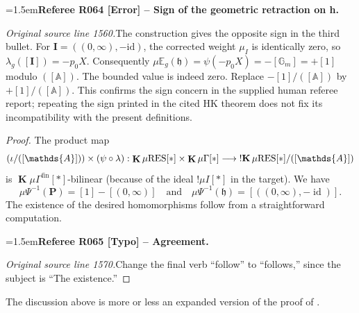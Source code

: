 \documentclass[12pt]{amsart}
\newcommand{\RefereeRemark}[4]{%
  \par\medskip\begingroup\normalfont\small\color{RefereePurple}%
  \emergencystretch=1.5em\noindent\textbf{Referee R#1 [#2] -- #3.}\par\nobreak\noindent #4\par
  \endgroup\medskip
}
\theoremstyle{plain}
\theoremstyle{definition}
\theoremstyle{remark}
\numberwithin{equation}{section}
\theoremstyle{plain}
\DeclareMathOperator{\id}{id}
\newcommand{\A}{\mathds{A}}
\newcommand{\dand}{\quad \text{and} \quad}
\newcommand{\gh}{\mathfrak{h}}
\newcommand{\0}{\emptyset}
\newcommand{\fun}{\longrightarrow}
\newcommand{\mG}{{\mu}{\Gamma}}
\newcommand{\RES}{\textup{RES}}
\newcommand{\mgRES}{{\mu}{\RES}}
\DeclareMathOperator{\ggk}{\mathbf{K}}
\DeclareMathOperator{\sggk}{!\mathbf{K}}
\DeclareMathOperator{\fin}{fin}
\begin{document}
\RefereeRemark{064}{Error}{Sign of the geometric retraction on h}{%
\textit{Original source line 1560.}\quad The construction gives the opposite sign in the third bullet. For $\bm I=((0,\infty),-\mathrm{id})$, the corrected weight $\mu_I$ is identically zero, so $\lambda_g([\bm I])=-p_0X$. Consequently $\mu\mathbb E_g(\mathfrak h)=\psi(-p_0X)=-[\mathbb G_m]=+[1]$ modulo $([\mathbb A])$. The bounded value is indeed zero. Replace $-[1]/([\mathbb A])$ by $+[1]/([\mathbb A])$. This confirms the sign concern in the supplied human referee report; repeating the sign printed in the cited HK theorem does not fix its incompatibility with the present definitions.
}
\begin{proof}
The product map
\[
(\iota /([\A])) \times (\psi \circ \lambda) : \ggk \mgRES[*] \times  \ggk \mG[*] \fun    \sggk \mgRES[*] /([\A])
\]
is $\ggk \mG^{\fin}[*]$-bilinear (because of  the ideal $!\mu I[*]$ in the target). We have
\[
{\mu}\Psi^{-1}(\bm P) = [1]-[(0, \infty)]  \dand {\mu}\Psi^{-1}(\gh) = [((0, \infty), -\id)].
\]
The existence of the desired homomorphisms follow from a straightforward computation.

\RefereeRemark{065}{Typo}{Agreement}{%
\textit{Original source line 1570.}\quad Change the final verb ``follow'' to ``follows,'' since the subject is ``The existence.''
}
\end{proof}

The discussion above is more or less an expanded version of the proof of \cite[Theorem~10.11]{hrushovski:kazhdan:integration:vf}.
\end{document}
